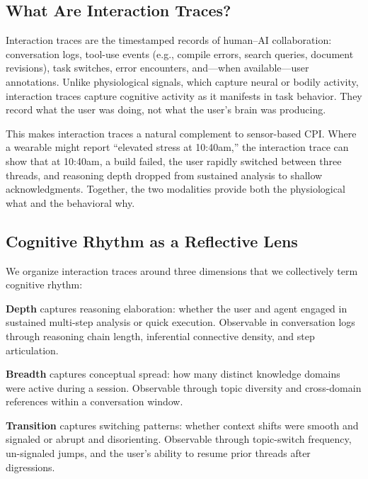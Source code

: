 \documentclass[10pt]{article}
\begin{document}
\subsection{What Are Interaction Traces?}

Interaction traces are the timestamped records of human--AI collaboration: conversation logs, tool-use events (e.g., compile errors, search queries, document revisions), task switches, error encounters, and---when available---user annotations. Unlike physiological signals, which capture neural or bodily activity, interaction traces capture cognitive activity as it manifests in task behavior. They record what the user was doing, not what the user's brain was producing.

This makes interaction traces a natural complement to sensor-based CPI. Where a wearable might report ``elevated stress at 10:40am,'' the interaction trace can show that at 10:40am, a build failed, the user rapidly switched between three threads, and reasoning depth dropped from sustained analysis to shallow acknowledgments. Together, the two modalities provide both the physiological what and the behavioral why.

\subsection{Cognitive Rhythm as a Reflective Lens}

We organize interaction traces around three dimensions that we collectively term cognitive rhythm:

\textbf{Depth} captures reasoning elaboration: whether the user and agent engaged in sustained multi-step analysis or quick execution. Observable in conversation logs through reasoning chain length, inferential connective density, and step articulation.

\textbf{Breadth} captures conceptual spread: how many distinct knowledge domains were active during a session. Observable through topic diversity and cross-domain references within a conversation window.

\textbf{Transition} captures switching patterns: whether context shifts were smooth and signaled or abrupt and disorienting. Observable through topic-switch frequency, un-signaled jumps, and the user's ability to resume prior threads after digressions.
\end{document}
